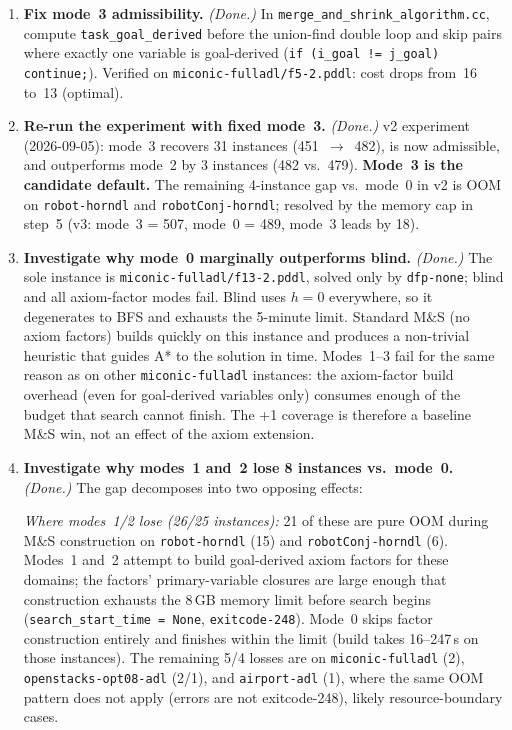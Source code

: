 \documentclass[11pt,a4paper]{article}
\begin{document}
\begin{enumerate}

  \item \textbf{Fix mode~3 admissibility.} \emph{(Done.)}
    In \texttt{merge\_and\_shrink\_algorithm.cc}, compute \texttt{task\_goal\_derived}
    before the union-find double loop and skip pairs where exactly one variable is
    goal-derived (\texttt{if (i\_goal != j\_goal) continue;}).
    Verified on \texttt{miconic-fulladl/f5-2.pddl}: cost drops from~16 to~13 (optimal).

  \item \textbf{Re-run the experiment with fixed mode~3.} \emph{(Done.)}
    v2 experiment (2026-09-05): mode~3 recovers 31 instances (451~$\to$~482),
    is now admissible, and outperforms mode~2 by 3 instances (482 vs.\ 479).
    \textbf{Mode~3 is the candidate default.}
    The remaining 4-instance gap vs.\ mode~0 in v2 is OOM on \texttt{robot-horndl}
    and \texttt{robotConj-horndl}; resolved by the memory cap in step~5
    (v3: mode~3 = 507, mode~0 = 489, mode~3 leads by 18).

  \item \textbf{Investigate why mode~0 marginally outperforms blind.}
    \emph{(Done.)}
    The sole instance is \texttt{miconic-fulladl/f13-2.pddl}, solved only by
    \texttt{dfp-none}; blind and all axiom-factor modes fail.
    Blind uses $h = 0$ everywhere, so it degenerates to BFS and exhausts the
    5-minute limit.  Standard M\&S (no axiom factors) builds quickly on this
    instance and produces a non-trivial heuristic that guides A* to the
    solution in time.  Modes~1--3 fail for the same reason as on other
    \texttt{miconic-fulladl} instances: the axiom-factor build overhead
    (even for goal-derived variables only) consumes enough of the budget
    that search cannot finish.  The +1 coverage is therefore a baseline M\&S
    win, not an effect of the axiom extension.

  \item \textbf{Investigate why modes~1 and~2 lose 8 instances vs.\ mode~0.}
    \emph{(Done.)}
    The gap decomposes into two opposing effects:

    \textit{Where modes~1/2 lose (26/25 instances):}
    21 of these are pure OOM during M\&S construction on \texttt{robot-horndl}
    (15) and \texttt{robotConj-horndl} (6).  Modes~1 and~2 attempt to build
    goal-derived axiom factors for these domains; the factors' primary-variable
    closures are large enough that construction exhausts the 8\,GB memory limit
    before search begins (\texttt{search\_start\_time = None},
    \texttt{exitcode-248}).  Mode~0 skips factor construction entirely and
    finishes within the limit (build takes 16--247\,s on those instances).
    The remaining 5/4 losses are on \texttt{miconic-fulladl} (2),
    \texttt{openstacks-opt08-adl} (2/1), and \texttt{airport-adl} (1), where
    the same OOM pattern does not apply (errors are not exitcode-248), likely
    resource-boundary cases.


\end{enumerate}
\end{document}
